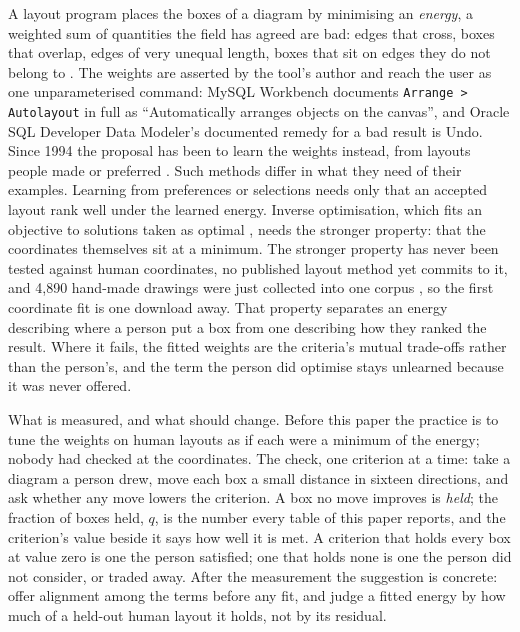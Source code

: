 \documentclass[a4paper,UKenglish]{gd-lipics-v3}
\begin{document}
A layout program places the boxes of a diagram by minimising an \emph{energy}, a weighted
sum of quantities the field has agreed are bad: edges that cross, boxes that overlap, edges
of very unequal length, boxes that sit on edges they do not belong to \cite{tdb88, dh96,
purchase02, kobourov}. The weights are asserted by the tool's author and reach the user
as one unparameterised command: MySQL Workbench documents \texttt{Arrange > Autolayout}
in full as ``Automatically arranges objects on the canvas'', and Oracle SQL Developer
Data Modeler's documented remedy for a bad result is Undo. Since 1994 the
proposal has been to learn the weights instead, from layouts people made or preferred
\cite{masui94, spoenemann14, klammler19, flud22, zhang26}. Such methods differ in what
they need of their examples. Learning from preferences or selections
\cite{masui94, spoenemann14, klammler19, zhang26} needs only that an accepted layout rank
well under the learned energy. Inverse optimisation, which fits an objective to solutions
taken as optimal \cite{ahuja01, keshavarz11, chan19}, needs the stronger property: that the
coordinates themselves sit at a minimum. The stronger property has never been tested
against human coordinates, no published layout method yet commits to it, and 4{,}890
hand-made drawings were just collected into one corpus \cite{gdcoll25}, so the first
coordinate fit is one download away. That property separates an energy describing where
a person put a box from one describing how they ranked the result. Where it fails, the
fitted weights are the criteria's mutual trade-offs rather than the person's, and the term
the person did optimise stays unlearned because it was never offered.

What is measured, and what should change. Before this paper the practice is to tune the
weights on human layouts as if each were a minimum of the energy; nobody had checked at
the coordinates. The check, one criterion at a time: take a diagram a person drew, move
each box a small distance in sixteen directions, and ask whether any move lowers the
criterion. A box no move improves is \emph{held}; the fraction of boxes held, $q$, is
the number every table of this paper reports, and the criterion's value beside it says
how well it is met. A criterion that holds every box at value zero is one the person
satisfied; one that holds none is one the person did not consider, or traded away. After
the measurement the suggestion is concrete: offer alignment among the terms before any
fit, and judge a fitted energy by how much of a held-out human layout it holds, not by
its residual.
\end{document}

